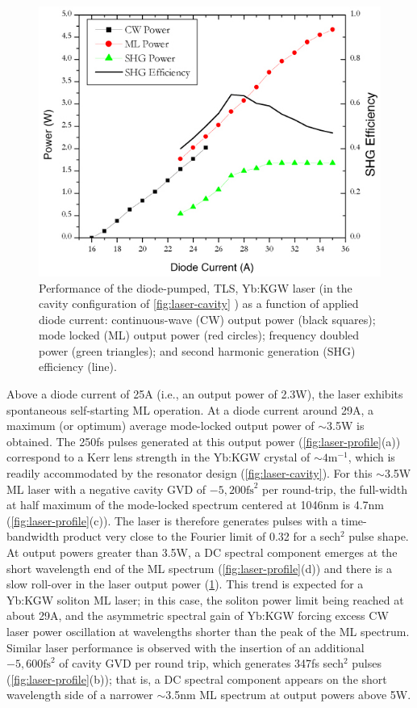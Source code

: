 \begin{figure}
  \centering
  \includegraphics{performance.jpg}
  \caption[Power measuments of employed ultrast laser]{
Performance of the diode-pumped, TLS, Yb:KGW laser (in the cavity configuration of \protect\ref{fig:laser-cavity}\protect{} ) as a function of applied diode current: continuous-wave (CW) output power (black squares); mode locked (ML) output power (red circles); frequency doubled power (green triangles); and second harmonic generation (SHG) efficiency (line).
  }
  \label{fig:laser-performance}
\end{figure}

Above a diode current of 25A (i.e., an output power of 2.3W), the laser exhibits spontaneous self-starting ML operation.
At a diode current around 29A, a maximum (or optimum) average mode-locked output power of $\sim$3.5W is obtained.
The 250fs pulses generated at this output power (\ref{fig:laser-profile}(a)) correspond to a Kerr lens strength in the Yb:KGW crystal of $\sim4 \text{m}^{-1}$, which is readily accommodated by the resonator design (\ref{fig:laser-cavity}).
For this $\sim$3.5W ML laser with a negative cavity GVD of $-5,200\text{fs}^2$ per round-trip, the full-width at
half maximum of the mode-locked spectrum centered at 1046nm is 4.7nm (\ref{fig:laser-profile}(c)).
The laser is therefore generates pulses with a time-bandwidth product very close to the Fourier limit of 0.32 for a sech$^2$ pulse shape.
At output powers greater than 3.5W, a DC spectral component emerges at the short wavelength end of the ML spectrum (\ref{fig:laser-profile}(d)) and there is a slow roll-over in the laser output power (\ref{fig:laser-performance}).
This trend is expected for a Yb:KGW soliton ML laser; in this case, the soliton power limit being reached at about 29A, and the asymmetric spectral gain of Yb:KGW forcing excess CW laser power oscillation at wavelengths shorter than the peak of the ML spectrum.
Similar laser performance is observed with the insertion of an additional $-5,600\text{fs}^2$ of cavity GVD per round trip, which generates 347fs sech$^2$ pulses (\ref{fig:laser-profile}(b)); that is, a DC spectral component appears on the short wavelength side of a narrower $\sim$3.5nm ML spectrum at output powers above 5W.

